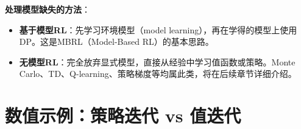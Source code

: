 \textbf{处理模型缺失的方法}：
\begin{itemize}
    \item \textbf{基于模型RL}：先学习环境模型（model learning），再在学得的模型上使用DP。这是MBRL（Model-Based RL）的基本思路。
    \item \textbf{无模型RL}：完全放弃显式模型，直接从经验中学习值函数或策略。Monte Carlo、TD、Q-learning、策略梯度等均属此类，将在后续章节详细介绍。
\end{itemize}

\section{数值示例：策略迭代 vs 值迭代}

